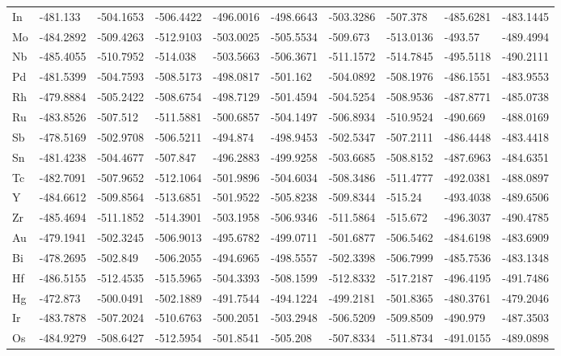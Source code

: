 \begin{table}[h]
{\begin{tabular}{*{10}{l}}
    In & -481.133  & -504.1653 & -506.4422 & -496.0016 & -498.6643 & -503.3286 & -507.378  & -485.6281 & -483.1445 \\
    Mo & -484.2892 & -509.4263 & -512.9103 & -503.0025 & -505.5534 & -509.673  & -513.0136 & -493.57   & -489.4994 \\
    Nb & -485.4055 & -510.7952 & -514.038  & -503.5663 & -506.3671 & -511.1572 & -514.7845 & -495.5118 & -490.2111 \\
    Pd & -481.5399 & -504.7593 & -508.5173 & -498.0817 & -501.162  & -504.0892 & -508.1976 & -486.1551 & -483.9553 \\
    Rh & -479.8884 & -505.2422 & -508.6754 & -498.7129 & -501.4594 & -504.5254 & -508.9536 & -487.8771 & -485.0738 \\
    Ru & -483.8526 & -507.512  & -511.5881 & -500.6857 & -504.1497 & -506.8934 & -510.9524 & -490.669  & -488.0169 \\
    Sb & -478.5169 & -502.9708 & -506.5211 & -494.874  & -498.9453 & -502.5347 & -507.2111 & -486.4448 & -483.4418 \\
    Sn & -481.4238 & -504.4677 & -507.847  & -496.2883 & -499.9258 & -503.6685 & -508.8152 & -487.6963 & -484.6351 \\
    Tc & -482.7091 & -507.9652 & -512.1064 & -501.9896 & -504.6034 & -508.3486 & -511.4777 & -492.0381 & -488.0897 \\
    Y  & -484.6612 & -509.8564 & -513.6851 & -501.9522 & -505.8238 & -509.8344 & -515.24   & -493.4038 & -489.6506 \\
    Zr & -485.4694 & -511.1852 & -514.3901 & -503.1958 & -506.9346 & -511.5864 & -515.672  & -496.3037 & -490.4785 \\
    Au & -479.1941 & -502.3245 & -506.9013 & -495.6782 & -499.0711 & -501.6877 & -506.5462 & -484.6198 & -483.6909 \\
    Bi & -478.2695 & -502.849  & -506.2055 & -494.6965 & -498.5557 & -502.3398 & -506.7999 & -485.7536 & -483.1348 \\
    Hf & -486.5155 & -512.4535 & -515.5965 & -504.3393 & -508.1599 & -512.8332 & -517.2187 & -496.4195 & -491.7486 \\
    Hg & -472.873  & -500.0491 & -502.1889 & -491.7544 & -494.1224 & -499.2181 & -501.8365 & -480.3761 & -479.2046 \\
    Ir & -483.7878 & -507.2024 & -510.6763 & -500.2051 & -503.2948 & -506.5209 & -509.8509 & -490.979  & -487.3503 \\
    Os & -484.9279 & -508.6427 & -512.5954 & -501.8541 & -505.208  & -507.8334 & -511.8734 & -491.0155 & -489.0898 \\

\end{tabular}}
\end{table}
